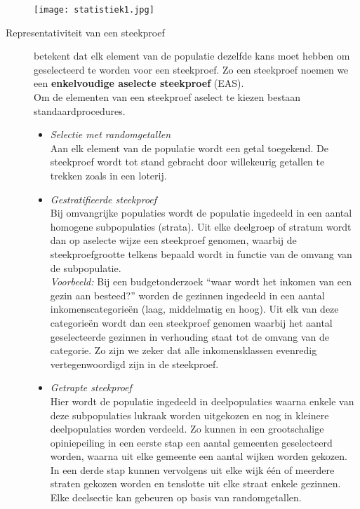 \begin{small}
\begin{description}

\texttt{[image: statistiek1.jpg]}
\newpage

\item[Representativiteit van een steekproef] betekent dat elk element van de populatie dezelfde kans moet hebben om geselecteerd te worden voor een steekproef. Zo een steekproef noemen we een \textbf{enkelvoudige aselecte steekproef} (EAS).\\Om de elementen van een steekproef aselect te kiezen bestaan standaardprocedures.
\begin{itemize}
\item {\em Selectie met randomgetallen}\\
Aan elk element van de populatie wordt een getal toegekend. De steekproef wordt tot stand gebracht door willekeurig getallen te trekken zoals in een loterij.
\item {\em Gestratifieerde steekproef} \\
Bij omvangrijke populaties wordt de populatie ingedeeld in een aantal homogene sub\-po\-pulaties (strata). Uit elke deelgroep of stratum wordt dan op aselecte wijze een steekproef genomen, waarbij de steekproefgrootte telkens bepaald wordt in functie van de omvang van de subpopulatie.\\
{\em Voorbeeld:} Bij een budgetonderzoek ``waar wordt het inkomen van een gezin aan besteed?'' worden de gezinnen ingedeeld in een aantal inkomenscategorie\"en
(laag, middelmatig en hoog). Uit elk van deze categorie\"en wordt dan een steekproef genomen waarbij het aantal geselecteerde gezinnen in verhouding staat tot de omvang van de categorie. Zo zijn we zeker dat alle inkomensklassen evenredig vertegenwoordigd zijn in de steekproef.
\item {\em Getrapte steekproef}\\
Hier wordt de populatie ingedeeld in deelpopulaties waarna enkele van deze subpopulaties lukraak worden uitgekozen en nog in kleinere deelpopulaties worden verdeeld.
Zo kunnen in een grootschalige opiniepeiling in een eerste stap een aantal gemeenten geselecteerd worden, waarna uit elke gemeente een aantal wijken worden gekozen. In een derde stap kunnen vervolgens uit elke wijk \'e\'en of meerdere straten gekozen worden en tenslotte uit elke straat enkele gezinnen. Elke deelsectie kan gebeuren op basis van randomgetallen.

\end{itemize}
\end{description}
\end{small}
